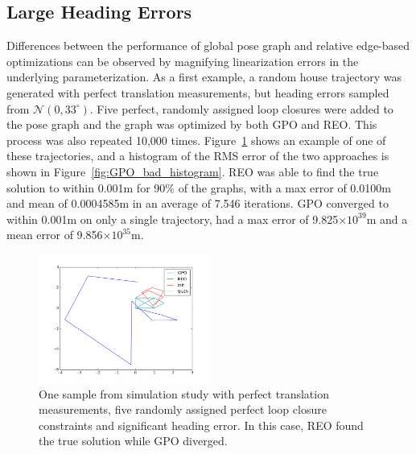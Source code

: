 \subsection{Large Heading Errors}
Differences between the performance of global pose graph and relative edge-based optimizations can be observed by magnifying linearization errors in the underlying parameterization. As a first example, a random house trajectory was generated with perfect translation measurements, but heading errors sampled from $\mathcal{N}(0, 33^\circ)$. Five perfect, randomly assigned loop closures were added to the pose graph and the graph was optimized by both GPO and REO.  This process was also repeated 10,000 times.  Figure~\ref{fig:GPO_heading_divergence} shows an example of one of these trajectories, and a histogram of the RMS error of the two approaches is shown in Figure~\ref{fig:GPO_bad_histogram}. REO was able to find the true solution to within 0.001m for 90\% of the graphs, with a max error of 0.0100m and mean of 0.0004585m in an average of 7.546 iterations.  GPO converged to within 0.001m on only a single trajectory, had a max error of 9.825$\times 10 ^{39}$m and a mean error of 9.856$\times 10 ^{35}$m.

\begin{figure}[H]
  \includegraphics[width=0.5\textwidth]{figures/GPO_diverged.png}
  \caption{One sample from simulation study with perfect translation measurements, five randomly assigned perfect loop closure constraints and significant heading error.  In this case, REO found the true solution while GPO diverged.}
  \label{fig:GPO_heading_divergence}
\end{figure}

